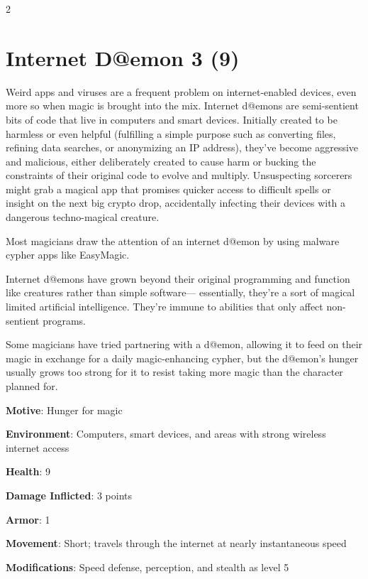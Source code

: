 \begin{multicols}{2}
\section{Internet D@emon 3 (9)}

Weird apps and viruses are a frequent problem on internet-enabled devices, even more so when magic is brought into the mix. Internet d@emons are semi-sentient bits of code that live in computers and smart devices. Initially created to be harmless or even helpful (fulfilling a simple purpose such as converting files, refining data searches, or anonymizing an IP address), they’ve become aggressive and malicious, either deliberately created to cause harm or bucking the constraints of their original code to evolve and multiply. Unsuspecting sorcerers might grab a magical app that promises quicker access to difficult spells or insight on the next big crypto drop, accidentally infecting their devices with a dangerous techno-magical creature. 

Most magicians draw the attention of an internet d@emon by using malware cypher apps like EasyMagic. 

Internet d@emons have grown beyond their original programming and function like creatures rather than simple software— essentially, they’re a sort of magical limited artificial intelligence. They’re immune to abilities that only affect non-sentient programs. 

Some magicians have tried partnering with a d@emon, allowing it to feed on their magic in exchange for a daily magic-enhancing cypher, but the d@emon’s hunger usually grows too strong for it to resist taking more magic than the character planned for.

\textbf{Motive}: Hunger for magic 

\textbf{Environment}: Computers, smart devices, and areas with strong wireless internet access 

\textbf{Health}: 9 

\textbf{Damage Inflicted}: 3 points 

\textbf{Armor}: 1 

\textbf{Movement}: Short; travels through the internet at nearly instantaneous speed 

\textbf{Modifications}: Speed defense, perception, and stealth as level 5 


\end{multicols}
